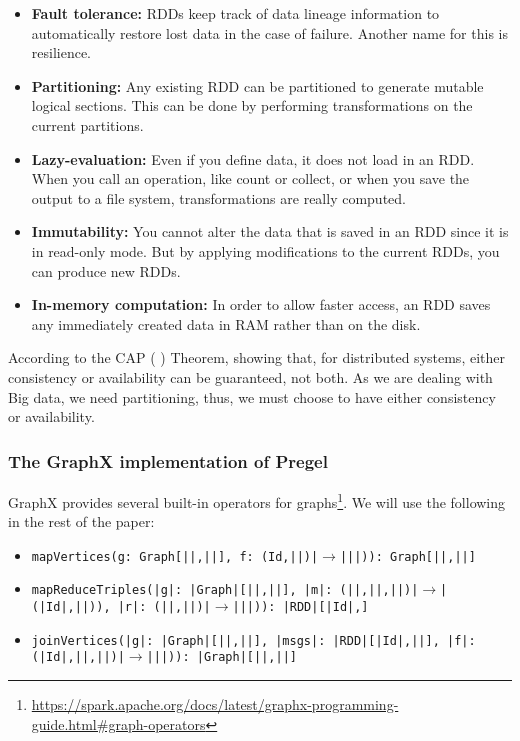 \begin{itemize}
    \item \textbf{Fault tolerance:} RDDs keep track of data lineage information to automatically restore lost data in the case of failure. Another name for this is resilience.
    \item \textbf{Partitioning:} Any existing RDD can be partitioned to generate mutable logical sections. This can be done by performing transformations on the current partitions.
    \item \textbf{Lazy-evaluation:} Even if you define data, it does not load in an RDD. When you call an operation, like count or collect, or when you save the output to a file system, transformations are really computed.
    \item \textbf{Immutability:} You cannot alter the data that is saved in an RDD since it is in read-only mode. But by applying modifications to the current RDDs, you can produce new RDDs.
    \item \textbf{In-memory computation:} In order to allow faster access, an RDD saves any immediately created data in RAM rather than on the disk.
\end{itemize}

According to the CAP (  ) Theorem, showing that, for distributed systems, either consistency or availability can be guaranteed, not both. As we are dealing with Big data, we need partitioning, thus, we must choose to have either consistency or availability.

\subsubsection{The GraphX implementation of Pregel}

GraphX provides several built-in operators for graphs\footnote{\url{https://spark.apache.org/docs/latest/graphx-programming-guide.html\#graph-operators}}. We will use the following in the rest of the paper:

\begin{itemize}
    \item \texttt{mapVertices(g: Graph[|\VertSet|,|\EdgeSet|], f: (Id,|\VertSet|)|$\rightarrow$||\VertSet|)): Graph[|\VertSet|,|\EdgeSet|]}
    \item \texttt{mapReduceTriples(|g|: |Graph|[|\VertSet|,|\EdgeSet|], |m|: (|\VertSet|,|\EdgeSet|,|\VertSet|)|$\rightarrow$|(|Id|,|\MsgSet|)), |r|: (|\MsgSet|,|\MsgSet|)|$\rightarrow$||\MsgSet|)): |RDD|[|Id|,\MsgSet]}
    \item \texttt{joinVertices(|g|: |Graph|[|\VertSet|,|\EdgeSet|], |msgs|: |RDD|[|Id|,|\MsgSet|], |f|: (|Id|,|\VertSet|,|\MsgSet|)|$\rightarrow$||\VertSet|)): |Graph|[|\VertSet|,|\EdgeSet|]}
\end{itemize}

